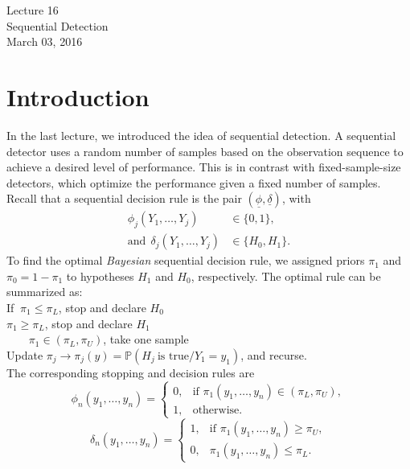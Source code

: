 \documentclass[a4paper,english,12pt]{article}
\newcommand{\spc}{\mathbb{P}}
\begin{document}
		\begin{center}
			\Large{Lecture 16}\\
			\vspace{12pt}
			{\huge{Sequential Detection}}\\
				\vspace{15pt}
					March 03, 2016
		\end{center}
		\vspace{20pt}
		
\section{Introduction}
In the last lecture, we introduced the idea of sequential detection. A sequential detector uses a random number of samples based on the observation sequence to achieve a desired level of performance. This is in contrast with fixed-sample-size detectors, which optimize the performance given a fixed number of samples.\\

Recall that a sequential decision rule is the pair  $(\underline{\phi},\underline{\delta})$, with
\begin{align*}
\phi_{j}(Y_{1},\ldots,Y_{j})&\in\{0,1\},\\
\text{and}~~\delta_{j}(Y_{1},\ldots,Y_{j})&\in\{H_{0},H_{1}\}.
\end{align*}
To find the optimal \textit{Bayesian} sequential decision rule, we assigned priors $\pi_{1}$ and $\pi_{0}=1-\pi_{1}$ to hypotheses $H_{1}$ and $H_{0}$, respectively. The optimal rule can be summarized as:\\
If $~\pi_{1}\leq\pi_{L}$, stop and declare $H_{0}$\\
\hspace{6pt}$\pi_{1}\geq\pi_{L}$, stop and declare $H_{1}$\\
$~~~~~~~~~\pi_{1}\in(\pi_{L},\pi_{U})$, take one sample\\
Update $\pi_{j}\rightarrow\pi_{j}(y)=\spc(H_{j}~\text{is true}/Y_{1}=y_{1})$, and recurse.\\

The corresponding stopping and decision rules are\\
 \begin{equation*}
 \phi_{n}(y_{1},\ldots,y_{n})=
 \begin{cases}
 0,& \text{if }\pi_{1}(y_{1},\ldots,y_{n})\in(\pi_{L},\pi_{U}),\\
 1,& \text{otherwise}.
 \end{cases}
 \end{equation*}
 \begin{equation*}
 \delta_{n}(y_{1},\ldots,y_{n})=
 \begin{cases}
 1,& \text{if }\pi_{1}(y_{1},\ldots,y_{n})\geq\pi_{U},\\
 0,& \pi_{1}(y_{1},\ldots,y_{n})\leq\pi_{L}.
 \end{cases}
 \end{equation*}
 
\end{document}

